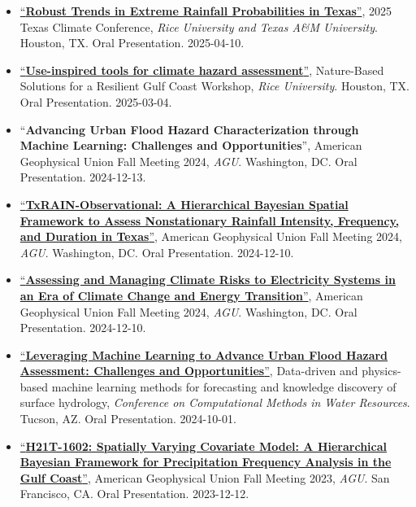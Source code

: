 \documentclass[10pt,oneside]{article}
\begin{document}
\begin{itemize}[label={}]

  \item \href{https://si.rice.edu/texas-climate-conference-2025}{\enquote{\textbf{Robust Trends in Extreme Rainfall Probabilities in Texas}}}, 2025 Texas Climate Conference,  \textit{Rice University and Texas A\&M University}. Houston, TX. Oral Presentation. 2025-04-10.

  \item \href{https://events.rice.edu/event/nbs-workshop#!view/all}{\enquote{\textbf{Use-inspired tools for climate hazard assessment}}}, Nature-Based Solutions for a Resilient Gulf Coast Workshop,  \textit{Rice University}. Houston, TX. Oral Presentation. 2025-03-04.

  \item \enquote{\textbf{Advancing Urban Flood Hazard Characterization through Machine Learning: Challenges and Opportunities}}, American Geophysical Union Fall Meeting 2024,  \textit{AGU}. Washington, DC. Oral Presentation. 2024-12-13.

  \item \href{https://agu.confex.com/agu/agu24/meetingapp.cgi/Paper/1624973}{\enquote{\textbf{TxRAIN-Observational: A Hierarchical Bayesian Spatial Framework to Assess Nonstationary Rainfall Intensity, Frequency, and Duration in Texas}}}, American Geophysical Union Fall Meeting 2024,  \textit{AGU}. Washington, DC. Oral Presentation. 2024-12-10.

  \item \href{https://agu.confex.com/agu/agu24/meetingapp.cgi/Paper/1711820}{\enquote{\textbf{Assessing and Managing Climate Risks to Electricity Systems in an Era of Climate Change and Energy Transition}}}, American Geophysical Union Fall Meeting 2024,  \textit{AGU}. Washington, DC. Oral Presentation. 2024-12-10.

  \item \href{https://cmwrconference.org/wp-content/uploads/2024/09/CMWR-2024-Agenda-Full.pdf}{\enquote{\textbf{Leveraging Machine Learning to Advance Urban Flood Hazard Assessment: Challenges and Opportunities}}}, Data-driven and physics-based machine learning methods for forecasting and knowledge discovery of surface hydrology,  \textit{Conference on Computational Methods in Water Resources}. Tucson, AZ. Oral Presentation. 2024-10-01.

  \item \href{https://agu.confex.com/agu/fm23/meetingapp.cgi/Paper/1328932}{\enquote{\textbf{H21T-1602: Spatially Varying Covariate Model: A Hierarchical Bayesian Framework for Precipitation Frequency Analysis in the Gulf Coast}}}, American Geophysical Union Fall Meeting 2023,  \textit{AGU}. San Francisco, CA. Oral Presentation. 2023-12-12.


\end{itemize}
\end{document}
